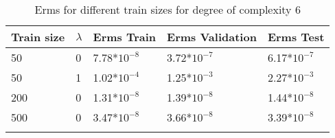 \begin{center}
\begin{longtable}{l l l l l}
\hline
\hline
\textbf{Train size} & \textbf{$\lambda$} & \textbf{Erms Train} & \textbf{Erms Validation} & \textbf{Erms Test}\\
\hline
\hline
50 & 0 & 7.78*$10^{-8}$ & 3.72*$10^{-7}$ & 6.17*$10^{-7}$  \\
50 & 1 & 1.02*$10^{-4}$ & 1.25*$10^{-3}$ & 2.27*$10^{-3}$ \\
200 & 0 & 1.31*$10^{-8}$ & 1.39*$10^{-8}$ & 1.44*$ 10^{-8}$  \\
500 & 0 & 3.47*$10^{-8}$ & 3.66*$10^{-8}$ & 3.39*$10^{-8}$\\
\hline
\caption{Erms for different train sizes for degree of complexity 6}
\end{longtable}
\end{center}

